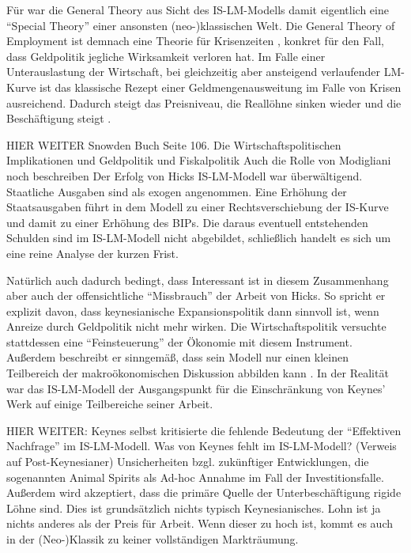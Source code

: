 Für \textcite{Hicks1937} war die General Theory aus Sicht des IS-LM-Modells damit eigentlich eine "`Special Theory"' einer ansonsten (neo-)klassischen Welt. Die General Theory of Employment ist demnach eine Theorie für Krisenzeiten \parencite[S. 155]{Hicks1937}, konkret für den Fall, dass Geldpolitik jegliche Wirksamkeit verloren hat. Im Falle einer Unterauslastung der Wirtschaft, bei gleichzeitig aber ansteigend verlaufender LM-Kurve ist das klassische Rezept einer Geldmengenausweitung im Falle von Krisen ausreichend. Dadurch steigt das Preisniveau, die Reallöhne sinken wieder und die Beschäftigung steigt \parencite[S. 30]{DeVroey2016}.

HIER WEITER Snowden Buch Seite 106. Die Wirtschaftspolitischen Implikationen und Geldpolitik und Fiskalpolitik
Auch die Rolle von Modigliani noch beschreiben
Der Erfolg von Hicks IS-LM-Modell war überwältigend. Staatliche Ausgaben sind als exogen angenommen. Eine Erhöhung der Staatsausgaben führt in dem Modell zu einer Rechtsverschiebung der IS-Kurve und damit zu einer Erhöhung des BIPs. Die daraus eventuell entstehenden Schulden sind im IS-LM-Modell nicht abgebildet, schließlich handelt es sich um eine reine Analyse der kurzen Frist.


Natürlich auch dadurch bedingt, dass 
Interessant ist in diesem Zusammenhang aber auch der offensichtliche "`Missbrauch"' der Arbeit von Hicks. So spricht er explizit \parencite[S. 154]{Hicks1937} davon, dass keynesianische Expansionspolitik dann sinnvoll ist, wenn Anreize durch Geldpolitik nicht mehr wirken. Die Wirtschaftspolitik versuchte stattdessen eine "`Feinsteuerung"' der Ökonomie mit diesem Instrument. Außerdem beschreibt er sinngemäß, dass sein Modell nur einen kleinen Teilbereich der makroökonomischen Diskussion abbilden kann \parencite[S. 158]{Hicks1937}. In der Realität war das IS-LM-Modell der Ausgangspunkt für die Einschränkung von Keynes' Werk auf einige Teilbereiche seiner Arbeit.


HIER WEITER: \parencite{Patinkin1990}
Keynes selbst kritisierte die fehlende Bedeutung der "`Effektiven Nachfrage"' im IS-LM-Modell.
Was von Keynes fehlt im IS-LM-Modell? (Verweis auf Post-Keynesianer) Unsicherheiten bzgl. zukünftiger Entwicklungen, die sogenannten Animal Spirits als Ad-hoc Annahme im Fall der Investitionsfalle. Außerdem wird akzeptiert, dass die primäre Quelle der Unterbeschäftigung rigide Löhne sind. Dies ist grundsätzlich nichts typisch Keynesianisches. Lohn ist ja nichts anderes als der Preis für Arbeit. Wenn dieser zu hoch ist, kommt es auch in der (Neo-)Klassik zu keiner vollständigen Markträumung.


